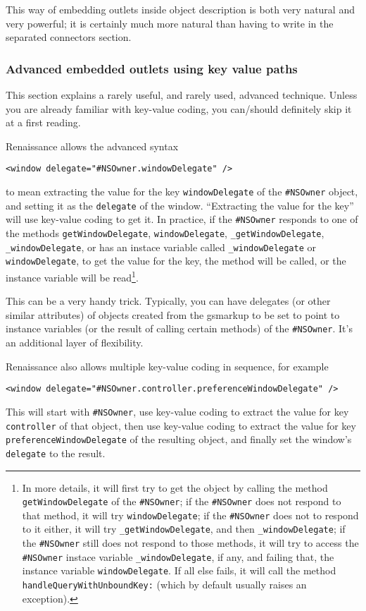 This way of embedding outlets inside object description is both very
natural and very powerful; it is certainly much more natural than
having to write in the separated connectors section.

\subsubsection{Advanced embedded outlets using key value paths}
This section explains a rarely useful, and rarely used, advanced
technique.  Unless you are already familiar with key-value coding, you
can/should definitely skip it at a first reading.

Renaissance allows the advanced syntax
\begin{verbatim}
<window delegate="#NSOwner.windowDelegate" />
\end{verbatim}
to mean extracting the value for the key \texttt{windowDelegate} of
the \texttt{\#NSOwner} object, and setting it as the \texttt{delegate}
of the window.  ``Extracting the value for the key'' will use
key-value coding to get it.  In practice, if the \texttt{\#NSOwner}
responds to one of the methods \texttt{getWindowDelegate},
\texttt{windowDelegate}, \texttt{\_getWindowDelegate}, 
\texttt{\_windowDelegate}, or has an instace variable called 
\texttt{\_windowDelegate} or \texttt{windowDelegate}, to get the value
for the key, the method will be called, or the instance variable
will be read\footnote{In more details, it will first try to get the
object by calling the method \texttt{getWindowDelegate} of the
\texttt{\#NSOwner}; if the \texttt{\#NSOwner} does not respond to that
method, it will try \texttt{windowDelegate}; if the \texttt{\#NSOwner}
does not to respond to it either, it will try
\texttt{\_getWindowDelegate}, and then \texttt{\_windowDelegate}; if the
\texttt{\#NSOwner} still does not respond to those methods, it will
try to access the \texttt{\#NSOwner} instace variable
\texttt{\_windowDelegate}, if any, and failing that, the instance variable
\texttt{windowDelegate}.  If all else fails, it will call the method
\texttt{handleQueryWithUnboundKey:} (which by default 
usually raises an exception).}.

This can be a very handy trick.  Typically, you can have delegates (or
other similar attributes) of objects created from the gsmarkup to be
set to point to instance variables (or the result of calling certain
methods) of the \texttt{\#NSOwner}.  It's an additional layer of
flexibility.

Renaissance also allows multiple key-value coding in sequence, for example
\begin{verbatim}
<window delegate="#NSOwner.controller.preferenceWindowDelegate" />
\end{verbatim}
This will start with \texttt{\#NSOwner}, use key-value coding to
extract the value for key \texttt{controller} of that object, then use
key-value coding to extract the value for key
\texttt{preferenceWindowDelegate} of the resulting object, and finally
set the window's \texttt{delegate} to the result.

